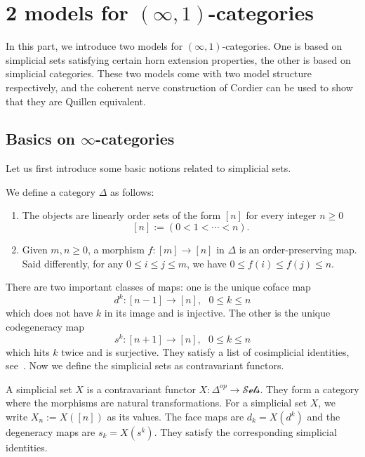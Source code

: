 \chapter{2 models for \((\infty,1)\)-categories}

In this part, we introduce two models for \((\infty,1)\)-categories. One is based on simplicial sets satisfying certain horn extension properties, the other is based on simplicial categories. These two models come with two model structure respectively, and the coherent nerve construction of Cordier can be used to show that they are Quillen equivalent. 

\section{Basics on \(\infty\)-categories}

Let us first introduce some basic notions related to simplicial sets. 
\begin{definition}
    We define a category \(\Delta\) as follows: 
    \begin{enumerate}
        \item The objects are linearly order sets of the form \([n]\) for every integer \(n\geq 0\)
              \[[n]:=(0<1<\cdots<n).\]
        \item Given \(m,n\geq 0\), a morphism \(f:[m]\rightarrow [n]\) in \(\Delta\) is an order-preserving map. Said differently, for any \(0\leq i\leq j\leq m\), we have \(0\leq f(i)\leq f(j)\leq n\).
     \end{enumerate}
\end{definition}

There are two important classes of maps: one is the unique coface map 
\[d^k:[n-1]\rightarrow [n],\ \ \ 0\leq k\leq n\]
which does not have \(k\) in its image and is injective. The other is the unique codegeneracy map 
\[s^k:[n+1]\rightarrow [n],\ \ \ 0\leq k\leq n\]
which hits \(k\) twice and is surjective. They satisfy a list of cosimplicial identities, see~\cite{goerssSimplicialHomotopyTheory2009}. Now we define the simplicial sets as contravariant functors. 

\begin{definition} 
    A simplicial set \(X\) is a contravariant functor \(X:\Delta^{op}\rightarrow \mathcal{Sets}\). They form a category where the morphisms are natural transformations. For a simplicial set \(X\), we write \(X_n:=X([n])\) as its values. The face maps are \(d_k=X(d^k)\) and the degeneracy maps are \(s_k=X(s^k)\). They satisfy the corresponding simplicial identities.
\end{definition}

